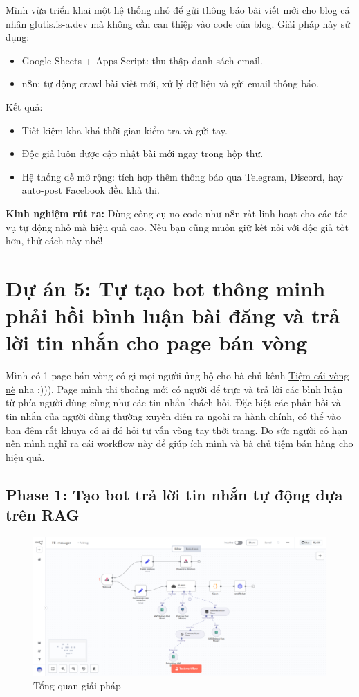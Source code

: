 Mình vừa triển khai một hệ thống nhỏ để gửi thông báo bài viết mới cho blog cá nhân glutis.is-a.dev mà không cần can thiệp vào code của blog. Giải pháp này sử dụng:

\begin{itemize}
    \item Google Sheets + Apps Script: thu thập danh sách email.

    \item n8n: tự động crawl bài viết mới, xử lý dữ liệu và gửi email thông báo.
\end{itemize}

Kết quả:
\begin{itemize}
    \item Tiết kiệm kha khá thời gian kiểm tra và gửi tay.
    \item Độc giả luôn được cập nhật bài mới ngay trong hộp thư.
    \item  Hệ thống dễ mở rộng: tích hợp thêm thông báo qua Telegram, Discord, hay auto-post Facebook đều khả thi.
\end{itemize}

\textbf{Kinh nghiệm rút ra:}
Dùng công cụ no-code như n8n rất linh hoạt cho các tác vụ tự động nhỏ mà hiệu quả cao. Nếu bạn cũng muốn giữ kết nối với độc giả tốt hơn, thử cách này nhé!

\newpage 


\section{Dự án 5: Tự tạo bot thông minh phải hồi bình luận bài đăng và trả lời tin nhắn cho page bán vòng}

Mình có 1 page bán vòng có gì mọi người ủng hộ cho bà chủ kênh 
\href{fb.com}{Tiệm cái vòng nè} nha :))). Page mình thi thoảng mới có người để trực và trả lời các bình luận từ phía người dùng cùng như các tin nhắn khách hỏi. Đặc biệt các phản hồi và tin nhắn của người dùng thường xuyên diễn ra ngoài ra hành chính, có thể vào ban đêm rất khuya có ai đó hỏi tư vấn vòng tay thời trang. Do sức người có hạn nên mình nghĩ ra cái workflow này để giúp ích mình và bà chủ tiệm bán hàng cho hiệu quả.

\subsection{Phase 1: Tạo bot trả lời tin nhắn tự động dựa trên RAG}
\begin{figure}[htbp]
    \centering
    \includegraphics[width=1\linewidth]{Chap1-7/fb_mess.pdf}
    \caption{Tổng quan giải pháp}
\end{figure}

